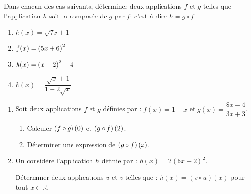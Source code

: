 \begin{exercice}[Reconnaissance]
 Dans chacun des cas suivants, déterminer deux applications   $  f $  et $ g $  telles que  l'application $ h $  soit la composée de   $  g $  par  $ f $:\; c'est à dire $ h=g\circ f $.

\begin{enumerate}
\item  $ h(x)= \sqrt{7x+1} $ 


\item  $ f(x)= \left(5x+6\right)^{2} $  


\item  $ h(x)= \left(x-2\right)^{2} -4 $ 



\item $ h(x)= \dfrac{\sqrt{x}+1}{1-2\sqrt{x}} $ 
\end{enumerate}

\end{exercice}
\begin{exercice}
\begin{enumerate}
\item Soit deux applications  $ f $ et $ g $ définies par :\;  $f(x)=1-x $ et $ g(x)=\dfrac{8x-4}{3x+3}$.
\begin{enumerate}
\item Calculer  $ \left(f\circ g\right)(0) $\;  et \; $ \left(g\circ f\right)(2) $.
\item Déterminer une expression de $ \left(g\circ f\right)(x) $. 
\end{enumerate}
\item On considère l'application $ h $ définie par :\; $ h(x)=2(5x-2)^2$.

 Déterminer deux applications  $ u $ et $ v $ telles que :\; $ h(x)=(v\circ u)(x)$\;\; pour tout \; $ x\in\mathbb{R} $.

\end{enumerate}
\end{exercice}
